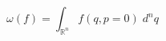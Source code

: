 \begin{equation}
            \label{eq:schroedinger}
            \omega(f) = \int_{\mathbb{R}^n} f(q, p=0) \; d^nq
        \end{equation}


